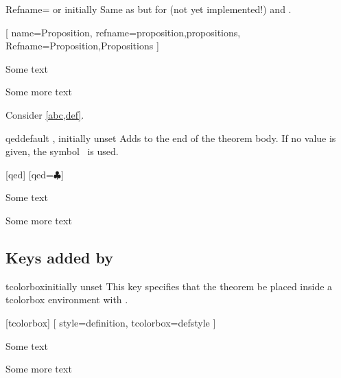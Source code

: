 \documentclass{ltxdoc}
\begin{document}
\begin{docKey}{Refname}{= or }{initially }
Same as  but for  (not yet implemented!) and .
\begin{tcbwritetemp}
[
  name=Proposition,
  refname={proposition,propositions},
  Refname={Proposition,Propositions}
  ]
\end{tcbwritetemp}
\begin{keythmscode}[withpreamble]
\begin{prop}[label=abc]
Some text
\end{prop}
\begin{prop}[label=def]
Some more text
\end{prop}
\begin{theorem}
Consider \cref{abc,def}.
\end{theorem}
\end{keythmscode}
\end{docKey}

\begin{docKey}{qed}{}{default , initially unset}
Adds  to the end of the theorem body. If no value is given, the symbol \openbox\ is used.
\begin{tcbwritetemp}
[qed]
[qed=$\clubsuit$]
\end{tcbwritetemp}
\begin{keythmscode}[withpreamble]
\begin{example}
Some text
\end{example}
\begin{solution}
Some more text
\end{solution}
\end{keythmscode}
\end{docKey}

\subsection{Keys added by } \label{thm-added-keys}

\begin{docKey}{tcolorbox}{}{initially unset}
This key specifies that the theorem be placed inside a tcolorbox environment with .
\begin{tcbwritetemp}
[tcolorbox]
[
  style=definition,
  tcolorbox={defstyle}
  ]
\end{tcbwritetemp}
\begin{keythmscode}[withpreamble]
\begin{corollary}
Some text
\end{corollary}
\begin{definition}
Some more text
\end{definition}
\end{keythmscode}
\end{docKey}
\end{document}
